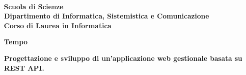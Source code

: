 \documentclass[a4paper,12pt,openright,twoside]{book}
\begin{document}
\frontmatter

\begin{titlepage}
	
	\noindent
	\begin{minipage}[t]{0.18\textwidth}
	\end{minipage}
	\begin{minipage}[t]{0.82\textwidth}
		{
			 \\
			\textbf{Scuola di Scienze} \\
			\textbf{Dipartimento di Informatica, Sistemistica e Comunicazione} \\
			\textbf{Corso di Laurea in Informatica} \\
			\par
		}
	\end{minipage}
	
	\vspace{35mm}
	
	\begin{center}
		{\LARGE{
				\begin{center} \textbf{Tempo} \end{center}
    			\textbf{ \Large { Progettazione e sviluppo di un'applicazione web gestionale basata su REST API. } }
				\par
		}}
	\end{center}
	

\end{titlepage}
\end{document}

